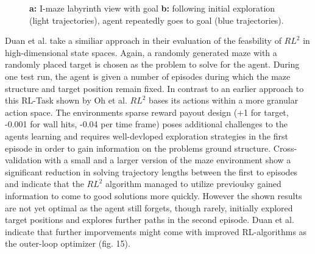 \documentclass[letterpaper, 10 pt, conference]{ieeeconf}  %
\begin{document}
\begin{figure}[thpb]
        \centering
  \caption{\textbf{a:} I-maze labyrinth view with goal \newline
  \textbf{b:} following initial exploration
  (light trajectories), agent repeatedly goes to goal (blue trajectories). \cite{wangLearningReinforcementLearn2016}
  }
        \label{figurelabel}
     \end{figure}

Duan et al.\cite{duanRLFastReinforcement2016} take a similiar approach in their 
evaluation of the feasbility of $RL^2$ in high-dimensional state spaces. Again, a randomly generated 
maze with a randomly placed target is chosen as the problem to solve for the agent. During one test run, the agent is given a number 
of episodes during which the maze structure and target position remain fixed. In contrast to an earlier approach to this RL-Task shown by Oh et al.
\cite{ohZeroShotTaskGeneralization2017} 
$RL^2$ bases its actions within a more granular action space. The environments sparse reward payout design (+1 for target, 
-0.001 for wall hits, -0.04 per time frame) poses additional challenges to the agents learning and requires well-devloped exploration strategies 
in the first episode in order to gain information on the problems ground structure. Cross-validation with a small and a larger version of the 
maze environment show a significant reduction in solving trajectory lengths between the first to episodes and indicate that the $RL^2$ algorithm 
managed to utilize previoulsy gained information to come to good solutions more quickly. However the shown results are not yet optimal
as the agent still forgets, though rarely, initially explored target positions and explores further paths in the second episode. Duan et al. 
indicate that further imporvements might come with improved RL-algorithms as the outer-loop optimizer (fig. 15). 
\end{document}
